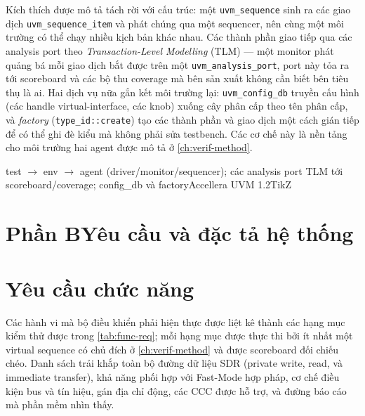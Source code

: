 Kích thích được mô tả tách rời với cấu trúc: một \texttt{uvm\_sequence} sinh ra các giao dịch
\texttt{uvm\_sequence\_item} và phát chúng qua một sequencer, nên cùng một môi trường có thể chạy
nhiều kịch bản khác nhau. Các thành phần giao tiếp qua các analysis port theo \emph{Transaction-Level
Modelling} (TLM) --- một monitor phát quảng bá mỗi giao dịch bắt được trên một
\texttt{uvm\_analysis\_port}, port này tỏa ra tới scoreboard và các bộ thu coverage mà bên sản
xuất không cần biết bên tiêu thụ là ai. Hai dịch vụ nữa gắn kết môi trường lại: \texttt{uvm\_config\_db}
truyền cấu hình (các handle virtual-interface, các knob) xuống cây phân cấp theo tên phân cấp, và
\emph{factory} (\texttt{type\_id::create}) tạo các thành phần và giao dịch một cách gián tiếp để
có thể ghi đè kiểu mà không phải sửa testbench. Các cơ chế này là nền tảng cho môi trường hai
agent được mô tả ở \cref{ch:verif-method}.

  {test $\rightarrow$ env $\rightarrow$ agent (driver/monitor/sequencer); các analysis port TLM
   tới scoreboard/coverage; config\_db và factory}{Accellera UVM 1.2}{TikZ}

\section*{Phần B\quad Yêu cầu và đặc tả hệ thống}

\section{Yêu cầu chức năng}
\label{sec:req-functional}

Các hành vi mà bộ điều khiển phải hiện thực được liệt kê thành các hạng mục kiểm thử được trong
\cref{tab:func-req}; mỗi hạng mục được thực thi bởi ít nhất một virtual sequence có chủ đích ở
\cref{ch:verif-method} và được scoreboard đối chiếu chéo. Danh sách trải khắp toàn bộ đường dữ
liệu SDR (private write, read, và immediate transfer), khả năng phối hợp với \iic{} Fast-Mode hợp
pháp, cơ chế điều kiện bus và tín hiệu, gán địa chỉ động, các CCC được hỗ trợ, và đường báo cáo
mà phần mềm nhìn thấy.

